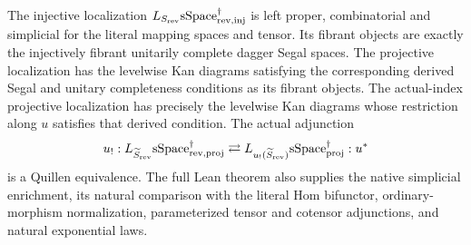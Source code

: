 \begin{resultblock}
\begin{theorem}
\label{catalogue:MainB}
The injective localization $L_{S_{\mathrm{rev}}}\mathrm{sSpace}^{\dag}_{\mathrm{rev},\mathrm{inj}}$ is left proper, combinatorial and simplicial for the literal mapping spaces and tensor.
Its fibrant objects are exactly the injectively fibrant unitarily complete dagger Segal spaces.
The projective localization has the levelwise Kan diagrams satisfying the corresponding derived Segal and unitary completeness conditions as its fibrant objects.
The actual-index projective localization has precisely the levelwise Kan diagrams whose restriction along $u$ satisfies that derived condition.
The actual adjunction
\begin{align}
 u_!:L_{\widetilde S_{\mathrm{rev}}}\mathrm{sSpace}^{\dag}_{\mathrm{rev},\mathrm{proj}}
 \rightleftarrows L_{u_!(\widetilde S_{\mathrm{rev}})}\mathrm{sSpace}^{\dag}_{\mathrm{proj}}:u^*
\end{align}
is a Quillen equivalence.
The full Lean theorem also supplies the native simplicial enrichment, its natural comparison with the literal Hom bifunctor, ordinary-morphism normalization, parameterized tensor and cotensor adjunctions, and natural exponential laws.
\end{theorem}

\end{resultblock}

